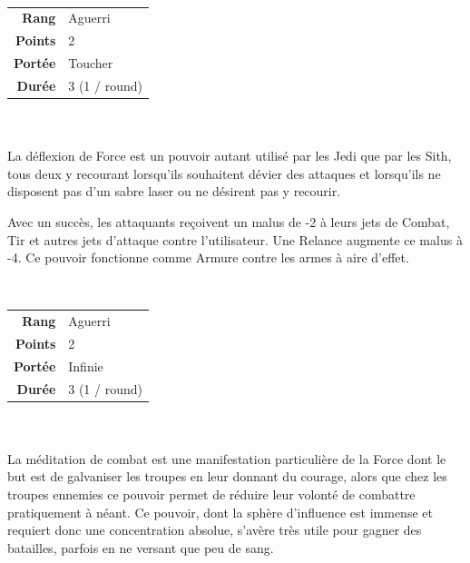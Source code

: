 \begin{description}[align=left] 

    \item [Déflexion de Force] ~ \\

        \begin{tabular}{ r l }
            \textbf{Rang}    & Aguerri \\
            \textbf{Points}  & 2 \\
            \textbf{Portée}  & Toucher \\
            \textbf{Durée}   & 3 (1 / round) \\
        \end{tabular}
        \\ \\
        La déflexion de Force est un pouvoir autant utilisé par les Jedi que par les Sith, tous deux y recourant lorsqu'ils souhaitent dévier des attaques et lorsqu'ils ne disposent pas d'un sabre laser ou ne désirent pas y recourir.

        Avec un succès, les attaquants reçoivent un malus de -2 à leurs jets de Combat, Tir et autres jets d’attaque contre l’utilisateur. Une Relance augmente ce malus à -4. Ce pouvoir fonctionne comme Armure contre les armes à aire d’effet.
        \\

    \item [Méditation de Combat] ~ \\

        \begin{tabular}{ r l }
            \textbf{Rang}    & Aguerri \\
            \textbf{Points}  & 2 \\
            \textbf{Portée}  & Infinie \\
            \textbf{Durée}   & 3 (1 / round) \\
        \end{tabular}
        \\ \\
        La méditation de combat est une manifestation particulière de la Force dont le but est de galvaniser les troupes en leur donnant du courage, alors que chez les troupes ennemies ce pouvoir permet de réduire leur volonté de combattre pratiquement à néant. Ce pouvoir, dont la sphère d'influence est immense et requiert donc une concentration absolue, s'avère très utile pour gagner des batailles, parfois en ne versant que peu de sang.


\end{description}
